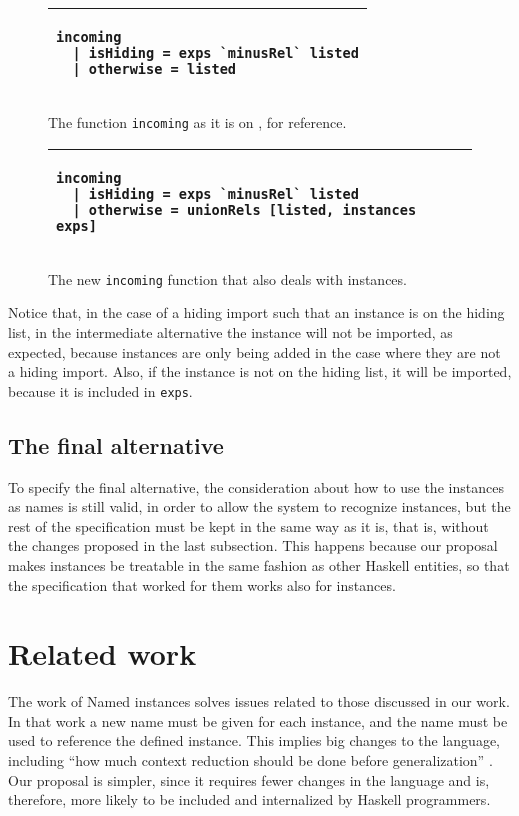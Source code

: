 \documentclass[msc]{ppgccufmg}
\begin{document}
{\begin{figure}
\caption{The function \texttt{incoming} as it is on \citep[section
    5.3]{formal}, for reference.\label{old-incoming}}
\begin{tabular}{|p{\textwidth}|}
\hline
\begin{verbatim}
incoming
  | isHiding = exps `minusRel` listed
  | otherwise = listed
\end{verbatim}
\\
\hline
\end{tabular}
\end{figure}

\begin{figure}
\caption{The new \texttt{incoming} function that also deals with
  instances.\label{new-incoming}}
\begin{tabular}{|p{\textwidth}|}
\hline
\begin{verbatim}
incoming
  | isHiding = exps `minusRel` listed
  | otherwise = unionRels [listed, instances exps]
\end{verbatim}
\\
\hline
\end{tabular}
\end{figure}

Notice that, in the case of a hiding import such that an instance is
on the hiding list, in the intermediate alternative the instance will
not be imported, as expected, because instances are only being added
in the case where they are not a hiding import.  Also, if the instance
is not on the hiding list, it will be imported, because it is included
in \texttt{exps}.

\section{The final alternative}
To specify the final alternative, the consideration about how to use the
instances as names is still valid, in order to allow the system to recognize
instances, but the
rest of the specification must be kept in the same way as it is, that is, without
the changes proposed in the last subsection.  This happens because our proposal
makes instances be treatable in the same fashion as other Haskell entities, so
that the specification that worked for them works also for instances.

\chapter{Related work}
\label{related}
The work of Named instances \citep{named} solves issues related to those
discussed in our work.  In that work a new name must be given for each instance,
and the name must be used to reference the defined instance.  This implies big changes to the
language, including ``how much context reduction should be done before
generalization'' \citep[p.~8]{tc}.  Our proposal is simpler, since it requires fewer
changes in the language and is, therefore, more likely to be included and
internalized by Haskell programmers.

}
\end{document}
